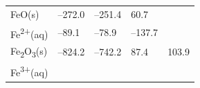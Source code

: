 \documentclass[
  9pt,
]{extbook}
\theoremstyle{definition}
\theoremstyle{definition}
\theoremstyle{definition}
\theoremstyle{remark}
\begin{document}
\begin{longtable}[]{@{}lllll@{}}
\begin{minipage}[t]{0.10\columnwidth}\raggedright
FeO(s)\strut
\end{minipage} & \begin{minipage}[t]{0.19\columnwidth}\raggedright
--272.0\strut
\end{minipage} & \begin{minipage}[t]{0.20\columnwidth}\raggedright
--251.4\strut
\end{minipage} & \begin{minipage}[t]{0.18\columnwidth}\raggedright
60.7\strut
\end{minipage} & \begin{minipage}[t]{0.18\columnwidth}\raggedright
\strut
\end{minipage}\tabularnewline
\begin{minipage}[t]{0.10\columnwidth}\raggedright
Fe\textsuperscript{2+}(aq)\strut
\end{minipage} & \begin{minipage}[t]{0.19\columnwidth}\raggedright
--89.1\strut
\end{minipage} & \begin{minipage}[t]{0.20\columnwidth}\raggedright
--78.9\strut
\end{minipage} & \begin{minipage}[t]{0.18\columnwidth}\raggedright
--137.7 \textbar{}\strut
\end{minipage} & \begin{minipage}[t]{0.18\columnwidth}\raggedright
\strut
\end{minipage}\tabularnewline
\begin{minipage}[t]{0.10\columnwidth}\raggedright
Fe\textsubscript{2}O\textsubscript{3}(s)\strut
\end{minipage} & \begin{minipage}[t]{0.19\columnwidth}\raggedright
--824.2\strut
\end{minipage} & \begin{minipage}[t]{0.20\columnwidth}\raggedright
--742.2\strut
\end{minipage} & \begin{minipage}[t]{0.18\columnwidth}\raggedright
87.4\strut
\end{minipage} & \begin{minipage}[t]{0.18\columnwidth}\raggedright
103.9\strut
\end{minipage}\tabularnewline
\begin{minipage}[t]{0.10\columnwidth}\raggedright
Fe\textsuperscript{3+}(aq)\strut

\end{minipage}
\end{longtable}
\end{document}
